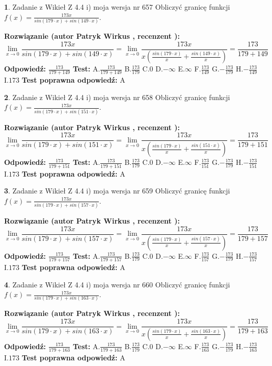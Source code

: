 \documentclass[12pt, a4paper]{article}
\theoremstyle{definition} %
\newtheorem{zad}{}
\newcommand{\zadStart}[1]{\begin{zad}#1\newline}
\newcommand{\zadStop}{\end{zad}}
\newcommand{\rozwStart}[2]{\noindent \textbf{Rozwiązanie (autor #1 , recenzent #2): }\newline}
\newcommand{\rozwStop}{\newline}
\newcommand{\odpStart}{\noindent \textbf{Odpowiedź:}\newline}
\newcommand{\odpStop}{\newline}
\newcommand{\testStart}{\noindent \textbf{Test:}\newline}
\newcommand{\testStop}{\newline}
\newcommand{\kluczStart}{\noindent \textbf{Test poprawna odpowiedź:}\newline}
\newcommand{\kluczStop}{\newline}
\begin{document}
\zadStart{Zadanie z Wikieł Z 4.4 i) moja wersja nr 657}
Obliczyć granicę funkcji $f(x)=\frac{173x}{sin(179\cdot x) +sin(149\cdot x)}$.
\zadStop
\rozwStart{Patryk Wirkus}{}
$$\lim\limits_{x\to 0}\frac{173x}{sin(179\cdot x) +sin(149\cdot x)}=\lim\limits_{x\to 0}\frac{173x}{x(\frac{sin(179\cdot x)}{x}+\frac{sin(149\cdot x)}{x})}=\frac{173}{179+149}$$
\rozwStop
\odpStart
$\frac{173}{179+149}$
\odpStop
\testStart
A.$\frac{173}{179+149}$
B.$\frac{173}{179}$
C.$0$
D.$-\infty$
E.$\infty$
F.$\frac{173}{149}$
G.$-\frac{173}{179}$
H.$-\frac{173}{149}$
I.$173$
\testStop
\kluczStart
A
\kluczStop



\zadStart{Zadanie z Wikieł Z 4.4 i) moja wersja nr 658}
Obliczyć granicę funkcji $f(x)=\frac{173x}{sin(179\cdot x) +sin(151\cdot x)}$.
\zadStop
\rozwStart{Patryk Wirkus}{}
$$\lim\limits_{x\to 0}\frac{173x}{sin(179\cdot x) +sin(151\cdot x)}=\lim\limits_{x\to 0}\frac{173x}{x(\frac{sin(179\cdot x)}{x}+\frac{sin(151\cdot x)}{x})}=\frac{173}{179+151}$$
\rozwStop
\odpStart
$\frac{173}{179+151}$
\odpStop
\testStart
A.$\frac{173}{179+151}$
B.$\frac{173}{179}$
C.$0$
D.$-\infty$
E.$\infty$
F.$\frac{173}{151}$
G.$-\frac{173}{179}$
H.$-\frac{173}{151}$
I.$173$
\testStop
\kluczStart
A
\kluczStop



\zadStart{Zadanie z Wikieł Z 4.4 i) moja wersja nr 659}
Obliczyć granicę funkcji $f(x)=\frac{173x}{sin(179\cdot x) +sin(157\cdot x)}$.
\zadStop
\rozwStart{Patryk Wirkus}{}
$$\lim\limits_{x\to 0}\frac{173x}{sin(179\cdot x) +sin(157\cdot x)}=\lim\limits_{x\to 0}\frac{173x}{x(\frac{sin(179\cdot x)}{x}+\frac{sin(157\cdot x)}{x})}=\frac{173}{179+157}$$
\rozwStop
\odpStart
$\frac{173}{179+157}$
\odpStop
\testStart
A.$\frac{173}{179+157}$
B.$\frac{173}{179}$
C.$0$
D.$-\infty$
E.$\infty$
F.$\frac{173}{157}$
G.$-\frac{173}{179}$
H.$-\frac{173}{157}$
I.$173$
\testStop
\kluczStart
A
\kluczStop



\zadStart{Zadanie z Wikieł Z 4.4 i) moja wersja nr 660}
Obliczyć granicę funkcji $f(x)=\frac{173x}{sin(179\cdot x) +sin(163\cdot x)}$.
\zadStop
\rozwStart{Patryk Wirkus}{}
$$\lim\limits_{x\to 0}\frac{173x}{sin(179\cdot x) +sin(163\cdot x)}=\lim\limits_{x\to 0}\frac{173x}{x(\frac{sin(179\cdot x)}{x}+\frac{sin(163\cdot x)}{x})}=\frac{173}{179+163}$$
\rozwStop
\odpStart
$\frac{173}{179+163}$
\odpStop
\testStart
A.$\frac{173}{179+163}$
B.$\frac{173}{179}$
C.$0$
D.$-\infty$
E.$\infty$
F.$\frac{173}{163}$
G.$-\frac{173}{179}$
H.$-\frac{173}{163}$
I.$173$
\testStop
\kluczStart
A
\kluczStop
\end{document}
